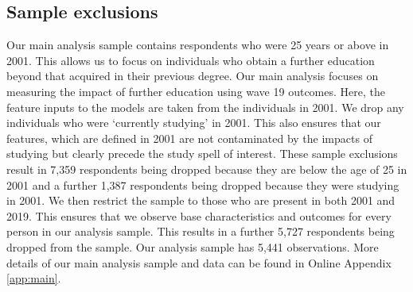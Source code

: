 \documentclass[12pt, a4paper]{article}
\begin{document}
\subsection{Sample exclusions}

Our main analysis sample contains respondents who were 25 years or above in 2001. This allows us to focus on individuals who obtain a further education beyond that acquired in their previous degree. Our main analysis focuses on measuring the impact of further education using
wave 19 outcomes. Here, the feature inputs to the models are taken from the
individuals in 2001. We drop any individuals who were ‘currently studying’ in 2001. This also ensures that our features, which are defined in 2001 are not
contaminated by the impacts of studying but clearly precede the study spell of
interest. These sample exclusions result in 7,359 respondents being dropped
because they are below the age of 25 in 2001 and a further 1,387 respondents
being dropped because they were studying in 2001.
We then restrict the sample to those who are present in both 2001 and 2019. This ensures that we observe base characteristics and outcomes for every person in our analysis sample. This results in a further 5,727 respondents being dropped from the sample. Our analysis sample has 5,441 observations. More details of our main analysis sample and data can be found in Online Appendix \ref{app:main}.%

\end{document}
